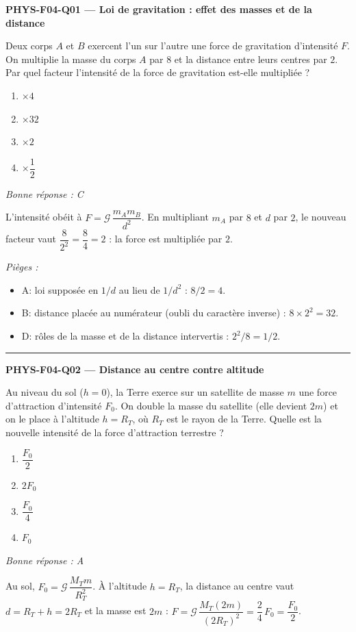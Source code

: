 \documentclass[11pt,a4paper]{article}
\begin{document}
\noindent\textbf{PHYS-F04-Q01 --- Loi de gravitation : effet des masses et de la distance}\par
Deux corps $A$ et $B$ exercent l'un sur l'autre une force de gravitation d'intensité $F$. On multiplie la masse du corps $A$ par $8$ et la distance entre leurs centres par $2$. Par quel facteur l'intensité de la force de gravitation est-elle multipliée ?
\begin{enumerate}[label=\Alph*)]
\item $\times 4$
\item $\times 32$
\item $\times 2$
\item $\times \dfrac{1}{2}$
\end{enumerate}
\textit{Bonne réponse : C}\par
L'intensité obéit à $F=\mathcal{G}\,\dfrac{m_A m_B}{d^2}$. En multipliant $m_A$ par $8$ et $d$ par $2$, le nouveau facteur vaut $\dfrac{8}{2^2}=\dfrac{8}{4}=2$ : la force est multipliée par $2$.\par
\textit{Pièges :}
\begin{itemize}
\item A: loi supposée en $1/d$ au lieu de $1/d^2$ : $8/2=4$.
\item B: distance placée au numérateur (oubli du caractère inverse) : $8\times 2^2=32$.
\item D: rôles de la masse et de la distance intervertis : $2^2/8=1/2$.
\end{itemize}
\vspace{8pt}\hrule\vspace{8pt}
\noindent\textbf{PHYS-F04-Q02 --- Distance au centre contre altitude}\par
Au niveau du sol ($h=0$), la Terre exerce sur un satellite de masse $m$ une force d'attraction d'intensité $F_0$. On double la masse du satellite (elle devient $2m$) et on le place à l'altitude $h=R_T$, où $R_T$ est le rayon de la Terre. Quelle est la nouvelle intensité de la force d'attraction terrestre ?
\begin{enumerate}[label=\Alph*)]
\item $\dfrac{F_0}{2}$
\item $2F_0$
\item $\dfrac{F_0}{4}$
\item $F_0$
\end{enumerate}
\textit{Bonne réponse : A}\par
Au sol, $F_0=\mathcal{G}\,\dfrac{M_T m}{R_T^2}$. À l'altitude $h=R_T$, la distance au centre vaut $d=R_T+h=2R_T$ et la masse est $2m$ : $F=\mathcal{G}\,\dfrac{M_T (2m)}{(2R_T)^2}=\dfrac{2}{4}\,F_0=\dfrac{F_0}{2}$.\par
\end{document}
